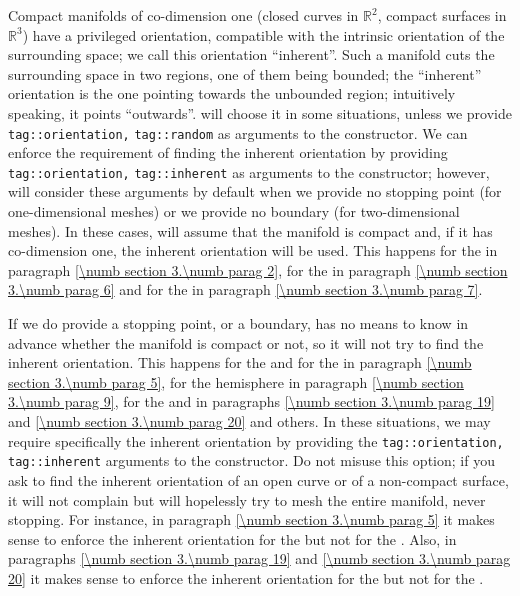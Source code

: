 Compact manifolds of co-dimension one (closed curves in $ \mathbb{R}^2 $,
compact surfaces in $ \mathbb{R}^3 $) have a privileged orientation,
compatible with the intrinsic orientation of the surrounding space;
we call this orientation ``inherent''.
Such a manifold cuts the surrounding space in two regions, one of them being bounded;
the ``inherent'' orientation is the one pointing towards the unbounded region;
intuitively speaking, it points ``outwards''.
{\ManiFEM} will choose it in some situations, unless we provide
{\small\tt\textcolor{tag}{tag}::orientation,} {\small\tt\textcolor{tag}{tag}::random}
as arguments to the {\small\tt{}} constructor.
We can enforce the requirement of finding the inherent orientation by providing
{\small\tt\textcolor{tag}{tag}::orientation,} {\small\tt\textcolor{tag}{tag}::inherent}
as arguments to the {\small\tt{}} constructor;
however, {\maniFEM} will consider these arguments by default when we provide no stopping
point (for one-dimensional meshes) or we provide no boundary (for two-dimensional meshes).
In these cases, {\maniFEM} will assume that the manifold is compact and, if it has
co-dimension one, the inherent orientation will be used.
This happens for the {\small\tt{}} in paragraph \ref{\numb section 3.\numb parag 2},
for the {\small\tt{}} in paragraph \ref{\numb section 3.\numb parag 6} and for the
{\small\tt{}} in paragraph \ref{\numb section 3.\numb parag 7}.

If we do provide a stopping point, or a boundary, {\maniFEM} has no means to know in
advance whether the manifold
is compact or not, so it will not try to find the inherent orientation.
This happens for the {\small\tt{}} and for the {\small\tt{}}
in paragraph \ref{\numb section 3.\numb parag 5}, for the {\small\tt{}} hemisphere
in paragraph \ref{\numb section 3.\numb parag 9}, for the {\small\tt{}} and
{\small\tt{}} in paragraphs \ref{\numb section 3.\numb parag 19} and
\ref{\numb section 3.\numb parag 20} and others.
In these situations, we may require specifically the inherent orientation
by providing the {\small\tt\textcolor{tag}{tag}::orientation,}
{\small\tt\textcolor{tag}{tag}::inherent} arguments to the {\small\tt{}} constructor.
Do not misuse this option; if you ask {\maniFEM} to find the inherent orientation of an open
curve or of a non-compact surface, it will not complain but will hopelessly try to mesh
the entire manifold, never stopping.
For instance, in paragraph \ref{\numb section 3.\numb parag 5} it makes sense to enforce the
inherent orientation for the {\small\tt{}} but not for the
{\small\tt{}}.
Also, in paragraphs \ref{\numb section 3.\numb parag 19} and
\ref{\numb section 3.\numb parag 20} it makes sense to enforce the inherent orientation
for the {\small\tt{}} but not for the {\small\tt{}}.

